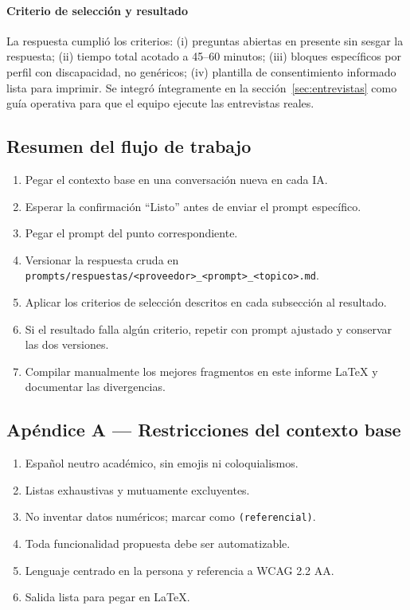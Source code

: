 \paragraph{Criterio de selección y resultado} La respuesta cumplió los
criterios: (i) preguntas abiertas en presente sin sesgar la respuesta;
(ii) tiempo total acotado a 45--60 minutos; (iii) bloques específicos
por perfil con discapacidad, no genéricos; (iv) plantilla de
consentimiento informado lista para imprimir. Se integró
íntegramente en la sección~\ref{sec:entrevistas} como guía operativa
para que el equipo ejecute las entrevistas reales.

\subsection{Resumen del flujo de trabajo}

\begin{enumerate}
  \item Pegar el contexto base en una conversación nueva en cada IA.
  \item Esperar la confirmación ``Listo'' antes de enviar el prompt
        específico.
  \item Pegar el prompt del punto correspondiente.
  \item Versionar la respuesta cruda en
        \texttt{prompts/respuestas/<proveedor>\_<prompt>\_<topico>.md}.
  \item Aplicar los criterios de selección descritos en cada
        subsección al resultado.
  \item Si el resultado falla algún criterio, repetir con prompt
        ajustado y conservar las dos versiones.
  \item Compilar manualmente los mejores fragmentos en este informe
        LaTeX y documentar las divergencias.
\end{enumerate}

\subsection*{Apéndice A --- Restricciones del contexto base}
\begin{enumerate}
  \item Español neutro académico, sin emojis ni coloquialismos.
  \item Listas exhaustivas y mutuamente excluyentes.
  \item No inventar datos numéricos; marcar como
        \texttt{(referencial)}.
  \item Toda funcionalidad propuesta debe ser automatizable.
  \item Lenguaje centrado en la persona y referencia a WCAG 2.2 AA.
  \item Salida lista para pegar en LaTeX.
\end{enumerate}
